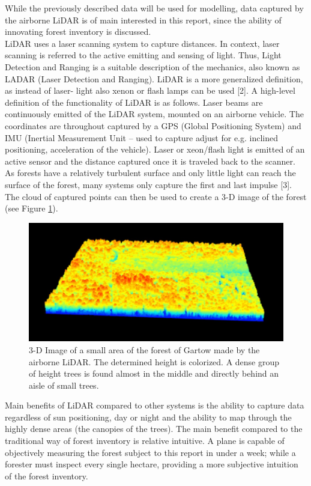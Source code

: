
While the previously described data will be used for modelling, data captured by the airborne LiDAR is of main interested in this report, since the ability of innovating forest inventory is discussed.\\

LiDAR uses a laser scanning system to capture distances. In context, laser scanning is referred to the active emitting and sensing of light. Thus, Light Detection and Ranging is a suitable description of the mechanics, also known as LADAR (Laser Detection and Ranging). LiDAR is a more generalized definition, as instead of laser- light also xenon or flash lamps can be used [2]. A high-level definition of the functionality of LiDAR is as follows. Laser beams are continuously emitted of the LiDAR system, mounted on an airborne vehicle. The coordinates are throughout captured by a GPS (Global Positioning System) and IMU (Inertial Measurement Unit – used to capture adjust for e.g. inclined positioning, acceleration of the vehicle). Laser or xeon/flash light is emitted of an active sensor and the distance captured once it is traveled back to the scanner. As forests have a relatively turbulent surface and only little light can reach the surface of the forest, many systems only capture the first and last impulse [3]. The cloud of captured points can then be used to create a 3-D image of the forest (see Figure \ref{fig:LiDAR}).

\begin{figure}[H]
  \includegraphics[width=\textwidth]{lidar.png}
  \caption{3-D Image of a small area of the forest of Gartow made by the airborne LiDAR. The determined height is colorized. A
dense group of height trees is found almost in the middle and directly behind an aisle of small trees.}
  \label{fig:LiDAR}
\end{figure}

Main benefits of LiDAR compared to other systems is the ability to capture data regardless of sun positioning, day or night and the ability to map through the highly dense areas (the canopies of the trees). The main benefit compared to the traditional way of forest inventory is relative intuitive. A plane is capable of objectively measuring the forest subject to this report in under a week; while a forester must inspect every single hectare, providing a more subjective intuition of the forest inventory.

